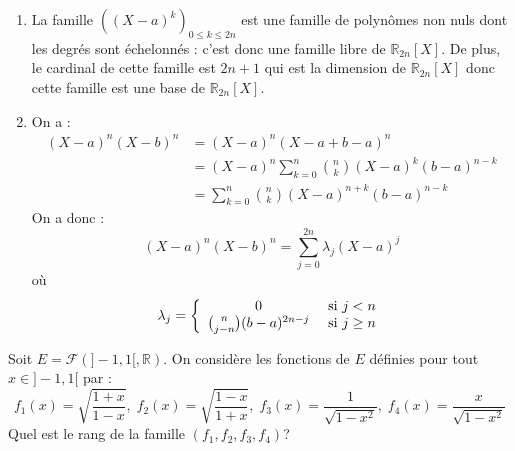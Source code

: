 \documentclass[a4paper,twoside,french,10pt]{VcCours}
\begin{document}
\begin{enumerate}
\item La famille $((X-a)^k)_{0 \leq k \leq 2n}$ est une famille de polynômes non nuls dont les degrés sont échelonnés : c'est donc une famille libre de $\mathbb{R}_{2n}[X]$. De plus, le cardinal de cette famille est $2n+1$ qui est la dimension de $\mathbb{R}_{2n}[X]$ donc cette famille est une base de $\mathbb{R}_{2n}[X]$.
\item On a :
\begin{align*}
(X-a)^n(X-b)^n & = (X-a)^n (X-a + b-a)^n \\
& = (X-a)^n \sum_{k=0}^n \binom{n}{k} (X-a)^k (b-a)^{n-k} \\
& = \sum_{k=0}^n \binom{n}{k} (X-a)^{n+k} (b-a)^{n-k} 
\end{align*}
On a donc :
$$ (X-a)^n(X-b)^n = \sum_{j=0}^{2n} \lambda_j (X-a)^j$$
où 
$$ \lambda_j = \left\lbrace \begin{array}{ccl}
0 & \hbox{ si } j <n\\
\binom{n}{j-n} (b-a)^{2n-j} & \hbox{ si } j \geq n \\
\end{array}\right.$$
\end{enumerate}

\medskip

\begin{Exercice}{} Soit $E = \mathcal{F}(]-1,1[, \mathbb{R})$. On considère les fonctions de $E$ définies pour tout $x \in ]-1,1[$ par : 
    \[
    f_1(x) = \sqrt {\frac{1 + x}{1 - x}} , \; f_2(x) = \sqrt {\frac{1 - x}{1 + x}} , \; f_3(x) = \frac{1}{\sqrt {1 - x^2}}, \; f_4(x) = \frac{x}{\sqrt {1 - x^2}}
    \]
Quel est le rang de la famille $(f_1 ,f_2 ,f_3 ,f_4)$?
\end{Exercice}
\end{document}
